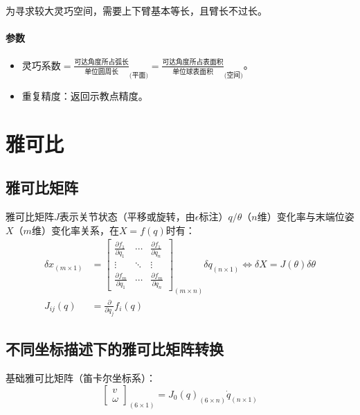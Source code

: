 \documentclass[
12pt, %
a4paper, 
oneside, %
headinclude,footinclude, %
]{scrartcl}
\begin{document}
为寻求较大灵巧空间，需要上下臂基本等长，且臂长不过长。
\paragraph{参数}
\begin{itemize}
\item $ \text{灵巧系数} = \frac{\text{可达角度所占弧长}}{\text{单位圆周长}}_{\text{(平面)}} = \frac{\text{可达角度所占表面积}}{\text{单位球表面积}}_{\text{(空间)}} $。
\item 重复精度：返回示教点精度。
\end{itemize} 
\section{雅可比}
\subsection[雅可比矩阵]{雅可比矩阵}
雅可比矩阵$ J $表示关节状态（平移或旋转，由$ \epsilon $标注）$ q/\theta $（$ n $维）变化率与末端位姿$ X $（$ m $维）变化率关系，在$ X = f(q) $时有：
\begin{align*}
\delta x_{(m \times 1)} &= \begin{bmatrix} \frac{\partial f_1}{\partial q_1} & \cdots & \frac{\partial f_1}{\partial q_n} \\ \vdots & \ddots & \vdots \\ \frac{\partial f_m}{\partial q_1} & \cdots & \frac{\partial f_m}{\partial q_n} \end{bmatrix}_{(m \times n)} \delta q_{(n \times 1)} \Leftrightarrow \delta X = J(\theta) \delta \theta \\
J_{ij}(q) &= \frac{\partial}{\partial q_j} f_i(q)
\end{align*}
\subsection[不同坐标描述下的雅可比矩阵转换]{不同坐标描述下的雅可比矩阵转换}
基础雅可比矩阵（笛卡尔坐标系）：
$$ \begin{bmatrix} v \\ \omega \end{bmatrix}_{(6 \times 1)} = J_0(q)_{(6 \times n)} \dot{q}_{(n \times 1)} $$
\end{document}
